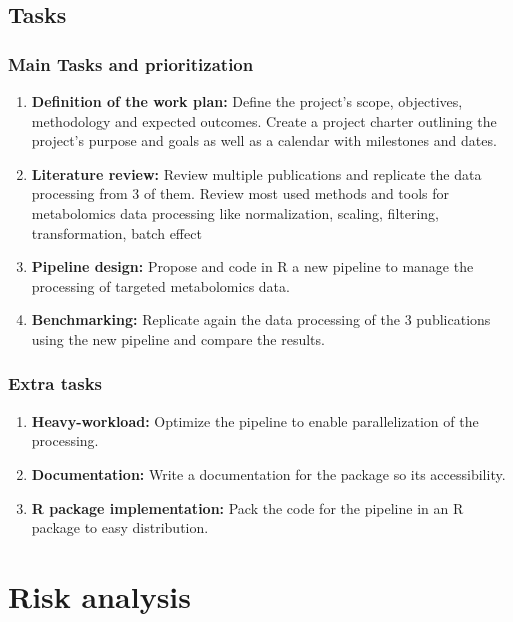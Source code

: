 \documentclass[ENG, BIB]{TFUOC}%
\begin{document}
\subsection{Tasks}
\subsubsection{Main Tasks and prioritization}
\begin{enumerate}
    \item \textbf{Definition of the work plan:} Define the project's scope, objectives, methodology and expected outcomes. Create a project charter outlining the project's purpose and goals as well as a calendar with milestones and dates.
    \item \textbf{Literature review:} Review multiple publications and replicate the data processing from 3 of them. Review most used methods and tools for metabolomics data processing like normalization, scaling, filtering, transformation, batch effect
    \item \textbf{Pipeline design:} Propose and code in R a new pipeline to manage the processing of targeted metabolomics data.
    \item \textbf{Benchmarking:} Replicate again the data processing of the 3 publications using the new pipeline and compare the results.
\end{enumerate}



\subsubsection{Extra tasks}
\begin{enumerate}
    \item \textbf{Heavy-workload:} Optimize the pipeline to enable parallelization of the processing.
    \item \textbf{Documentation:} Write a documentation for the package so its accessibility.
    \item \textbf{R package implementation:} Pack the code for the pipeline in an R package to easy distribution.

\end{enumerate}


\section{Risk analysis}
\end{document}
